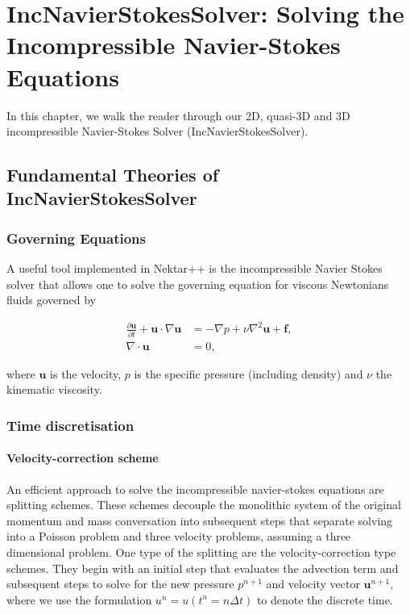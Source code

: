 \chapter{IncNavierStokesSolver: Solving the Incompressible Navier-Stokes Equations}

In this chapter, we walk the reader through our 2D, quasi-3D and 3D incompressible Navier-Stokes Solver (IncNavierStokesSolver).

\section{Fundamental Theories of IncNavierStokesSolver}

\subsection{Governing Equations}

A useful tool implemented in Nektar++ is the incompressible Navier
Stokes solver that allows one to solve the governing equation for
viscous Newtonians fluids governed by

\begin{subequations}
\begin{align}
    \frac{\partial \mathbf{u}}{\partial t} + \mathbf{u} \cdot \nabla \mathbf{u} &= -\nabla p + \nu \nabla^2 \mathbf{u} +  \mathbf{f}, \label{eq.navierstokes} \\
    \nabla \cdot \mathbf{u} &= 0,
\end{align}
\end{subequations}

where $\mathbf{u}$ is the velocity, $p$ is the specific pressure (including
density) and $\nu$ the kinematic viscosity.


\subsection{Time discretisation}
\subsubsection{Velocity-correction scheme}
An efficient approach to solve the incompressible navier-stokes equations  are splitting schemes.
These schemes decouple the monolithic system of the original momentum and mass conversation into subsequent steps that separate solving into a Poisson problem and three velocity problems, assuming a three dimensional problem.
One type of the splitting are the velocity-correction type schemes.
They begin with an initial step that evaluates the advection term and subsequent steps to solve for the new pressure $p^{n+1}$ and velocity vector $\mathbf{u}^{n+1}$, where we use the formulation $u^{n} = u(t^{n} = n \Delta t)$ to denote the discrete time.

